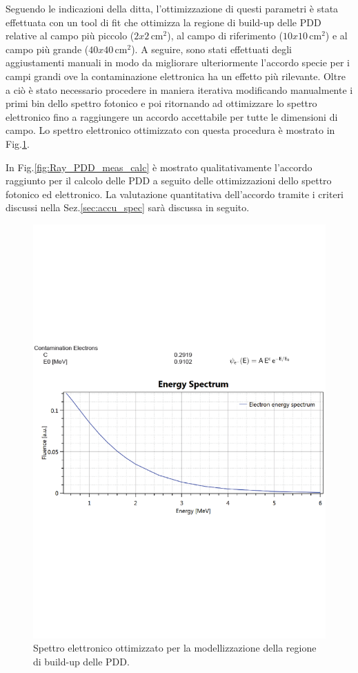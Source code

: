 Seguendo le indicazioni della ditta, l'ottimizzazione di questi parametri è stata effettuata con un tool di fit che ottimizza la regione di build-up delle PDD relative al campo più piccolo ($2x2\,$cm$^2$), al campo di riferimento ($10x10\,$cm$^2$) e al campo più grande ($40x40\,$cm$^2$). A seguire, sono stati effettuati degli aggiustamenti manuali in modo da migliorare ulteriormente l'accordo specie per i campi grandi ove la contaminazione elettronica ha un effetto più rilevante. Oltre a ciò è stato necessario procedere in maniera iterativa modificando manualmente i primi bin dello spettro fotonico e poi ritornando ad ottimizzare lo spettro elettronico fino a raggiungere un accordo accettabile per tutte le dimensioni di campo. Lo spettro elettronico ottimizzato con questa procedura è mostrato in Fig.\ref{fig:Ray_spectrum_ele}.

In Fig.\ref{fig:Ray_PDD_meas_calc} è mostrato qualitativamente l'accordo raggiunto per il calcolo delle PDD a seguito delle ottimizzazioni dello spettro fotonico ed elettronico. La valutazione quantitativa dell'accordo tramite i criteri discussi nella Sez.\ref{sec:accu_spec} sarà discussa in seguito.

\begin{figure}
\centering
\includegraphics[width=\textwidth]{./cap2/Ray_spectrum_ele.pdf}
\caption{Spettro elettronico ottimizzato per la modellizzazione della regione di build-up delle PDD.}
\label{fig:Ray_spectrum_ele}
\end{figure}

